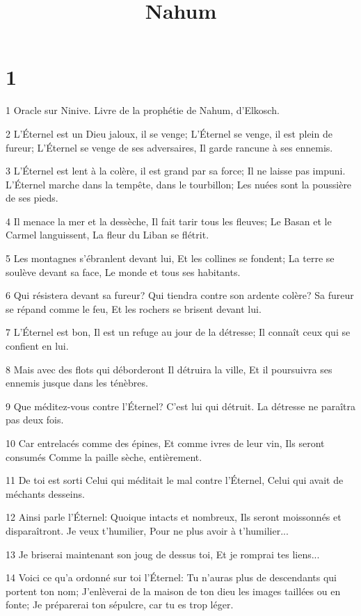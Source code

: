

\title{Nahum}


\chapter{1}

\par 1 Oracle sur Ninive. Livre de la prophétie de Nahum, d'Elkosch.
\par 2 L'Éternel est un Dieu jaloux, il se venge; L'Éternel se venge, il est plein de fureur; L'Éternel se venge de ses adversaires, Il garde rancune à ses ennemis.
\par 3 L'Éternel est lent à la colère, il est grand par sa force; Il ne laisse pas impuni. L'Éternel marche dans la tempête, dans le tourbillon; Les nuées sont la poussière de ses pieds.
\par 4 Il menace la mer et la dessèche, Il fait tarir tous les fleuves; Le Basan et le Carmel languissent, La fleur du Liban se flétrit.
\par 5 Les montagnes s'ébranlent devant lui, Et les collines se fondent; La terre se soulève devant sa face, Le monde et tous ses habitants.
\par 6 Qui résistera devant sa fureur? Qui tiendra contre son ardente colère? Sa fureur se répand comme le feu, Et les rochers se brisent devant lui.
\par 7 L'Éternel est bon, Il est un refuge au jour de la détresse; Il connaît ceux qui se confient en lui.
\par 8 Mais avec des flots qui déborderont Il détruira la ville, Et il poursuivra ses ennemis jusque dans les ténèbres.
\par 9 Que méditez-vous contre l'Éternel? C'est lui qui détruit. La détresse ne paraîtra pas deux fois.
\par 10 Car entrelacés comme des épines, Et comme ivres de leur vin, Ils seront consumés Comme la paille sèche, entièrement.
\par 11 De toi est sorti Celui qui méditait le mal contre l'Éternel, Celui qui avait de méchants desseins.
\par 12 Ainsi parle l'Éternel: Quoique intacts et nombreux, Ils seront moissonnés et disparaîtront. Je veux t'humilier, Pour ne plus avoir à t'humilier...
\par 13 Je briserai maintenant son joug de dessus toi, Et je romprai tes liens...
\par 14 Voici ce qu'a ordonné sur toi l'Éternel: Tu n'auras plus de descendants qui portent ton nom; J'enlèverai de la maison de ton dieu les images taillées ou en fonte; Je préparerai ton sépulcre, car tu es trop léger.

